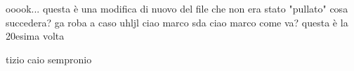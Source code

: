 \usepackage{pdfcomment}


    ooook... questa è una modifica di nuovo del file che non era stato "pullato" cosa succedera?
    ga    roba a caso 
    uhljl
    ciao marco sda
    ciao marco come va? questa è la 20esima volta 
    

    tizio caio
    sempronio
